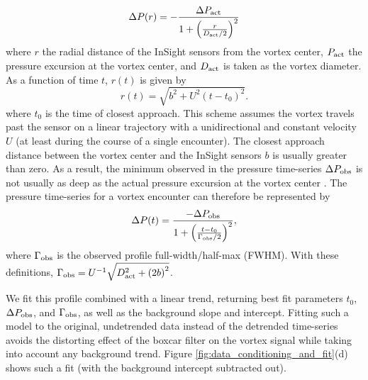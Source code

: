 \documentclass{aastex63}
\begin{document}
\begin{equation}
    \Delta P(r) = -\frac{\Delta P_{\rm act}}{1 + \left( \frac{r}{D_{\rm act}/2} \right)^2}\label{eqn:radial_lorentzian_profile}
\end{equation}
where $r$ the radial distance of the InSight sensors from the vortex center, $P_{\rm act}$ the pressure excursion at the vortex center, and $D_{\rm act}$ is taken as the vortex diameter. As a function of time $t$, $r(t)$ is given by
\begin{equation}
    r(t) = \sqrt{b^2 + U^2 \left( t - t_0 \right)^2}.\label{eqn:radial_distance}
\end{equation}
where $t_0$ is the time of closest approach. This scheme assumes the vortex travels past the sensor on a linear trajectory with a unidirectional and constant velocity $U$ (at least during the course of a single encounter). The closest approach distance between the vortex center and the InSight sensors $b$ is usually greater than zero. As a result, the minimum observed in the pressure time-series $\Delta P_{\rm obs}$ is not usually as deep as the actual pressure excursion at the vortex center \citep{2018Icar..299..166J, 2019Icar..317..209K}. The pressure time-series for a vortex encounter can therefore be represented by 
\begin{equation}
    \Delta P(t) = \frac{-\Delta P_{\rm obs}}{1 + \left( \frac{ t - t_0 }{\Gamma_{\rm obs}/2} \right)^2},\label{eqn:Lorentzian_profile}
\end{equation}
where $\Gamma_{\rm obs}$ is the observed profile full-width/half-max (FWHM). With these definitions, $\Gamma_{\rm obs} = U^{-1} \sqrt{D_{\rm act}^2 + \left( 2 b \right)^2}$. 

We fit this profile combined with a linear trend, returning best fit parameters $t_0$, $\Delta P_{\rm obs}$, and $\Gamma_{\rm obs}$, as well as the background slope and intercept. Fitting such a model to the original, undetrended data instead of the detrended time-series avoids the distorting effect of the boxcar filter on the vortex signal while taking into account any background trend. Figure \ref{fig:data_conditioning_and_fit}(d) shows such a fit (with the background intercept subtracted out).
\end{document}
